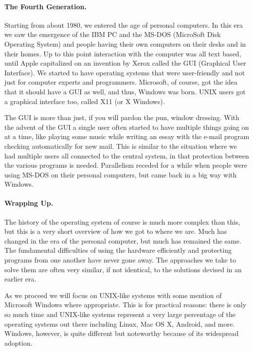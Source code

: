 \paragraph{The Fourth Generation.} Starting from about 1980, we entered the age of personal computers. In this era we saw the emergence of the IBM PC and the MS-DOS (MicroSoft Disk Operating System) and people having their own computers on their desks and in their homes. Up to this point interaction with the computer was all text based, until Apple capitalized on an invention by Xerox called the GUI (Graphical User Interface). We started to have operating systems that were user-friendly and not just for computer experts and programmers. Microsoft, of course, got the idea that it should have a GUI as well, and thus, Windows was born. UNIX users got a graphical interface too, called X11 (or X Windows). 

The GUI is more than just, if you will pardon the pun, window dressing. With the advent of the GUI a single user often started to have multiple things going on at a time, like playing some music while writing an essay with the e-mail program checking automatically for new mail. This is similar to the situation where we had multiple users all connected to the central system, in that protection between the various programs is needed. Parallelism receded for a while when people were using MS-DOS on their personal computers, but came back in a big way with Windows.

\paragraph{Wrapping Up.}
The history of the operating system of course is much more complex than this, but this is a very short overview of how we got to where we are. Much has changed in the era of the personal computer, but much has remained the same. The fundamental difficulties of using the hardware efficiently and protecting programs from one another have never gone away. The approaches we take to solve them are often very similar, if not identical, to the solutions devised in an earlier era.

As we proceed we will focus on UNIX-like systems with some mention of Microsoft Windows where appropriate. This is for practical reasons: there is only so much time and UNIX-like systems represent a very large percentage of the operating systems out there including Linux, Mac OS X, Android, and more. Windows, however, is quite different but noteworthy because of its widespread adoption. 



